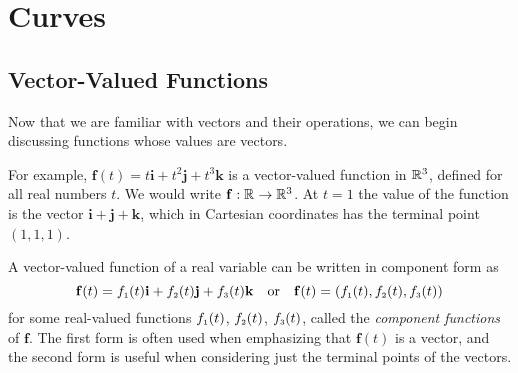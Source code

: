 \chapter{Curves}
\label{chapter:curves}
\section{Vector-Valued Functions}
Now that we are familiar with vectors and their operations, we can begin discussing functions whose values are
vectors.


For example, $\mathbf{f}(t) = t \mathbf{i} + t^2 \mathbf{j} + t^3 \mathbf{k}$ is a vector-valued function in $\mathbb{R}^{3}$,
defined for all real numbers $t$. 
We would write $\mathbf{f}: \mathbb{R}^{} \rightarrow \mathbb{R}^{3}$. 
At $t = 1$
the value of the function is the vector $\mathbf{i} + \mathbf{j} + \mathbf{k}$, which in Cartesian coordinates has the
terminal point $(1,1,1)$.

A vector-valued function of a real variable can be written in component form as
\begin{displaymath}
 \mathbf{f}(t) = f_{\scriptscriptstyle 1}(t) \mathbf{i} + f_{\scriptscriptstyle 2}(t) \mathbf{j} + f_{\scriptscriptstyle 3}(t) \mathbf{k}\quad\text{or}\quad\mathbf{f}(t) = ( f_{\scriptscriptstyle 1}(t),f_{\scriptscriptstyle 2}(t),f_{\scriptscriptstyle 3}(t) )
\end{displaymath}
for some real-valued functions $f_{\scriptscriptstyle 1}(t)$, $f_{\scriptscriptstyle 2}(t)$, $f_{\scriptscriptstyle 3}(t)$, called the \emph{component 
functions} of $\mathbf{f}$. 
The first form is often used when emphasizing that $\mathbf{f}(t)$ is a vector, and the second form is useful when considering just the terminal points of the vectors.

